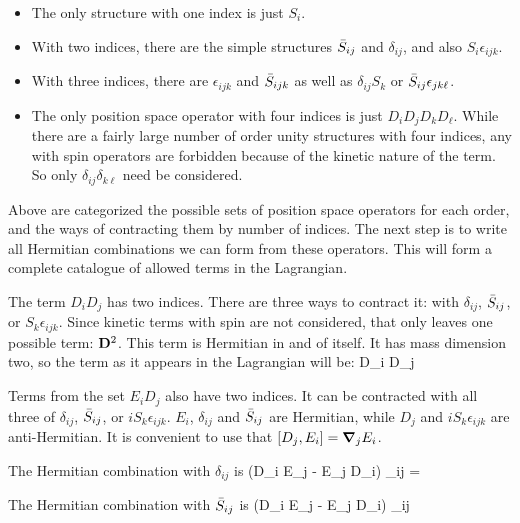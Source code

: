 \begin{itemize}
\item The only structure with one index is just $S_i$.

\item With two indices, there are the simple structures $\bar{S}_{ij}$ and $\delta_{ij}$, and also $S_i \epsilon_{ijk}$.

\item With three indices, there are $\epsilon_{ijk}$ and $\bar{S}_{ijk}$ as well as $\delta_{ij} S_k$ or $\bar{S}_{ij} \epsilon_{jk\ell}$.

\item The only position space operator with four indices is just $D_i D_j D_k D_\ell$.  While there are a fairly large number of order unity structures with four indices, any with spin operators are forbidden because of the kinetic nature of the term.  So only $\delta_{ij} \delta_{k\ell}$ need be considered.
\end{itemize}

Above are categorized the possible sets of position space operators for each order, and the ways of contracting them by number of indices.  The next step is to write all Hermitian combinations we can form from these operators.  This will form a complete catalogue of allowed terms in the Lagrangian.

The term $D_i D_j$ has two indices.  There are three ways to contract it: with $\delta_{ij}$, $\bar{S}_{ij}$, or $S_k \epsilon_{ijk}$.  Since kinetic terms with spin are not considered, that only leaves one possible term: $\mathbf{D}^2$.  This term is Hermitian in and of itself.  It has mass dimension two, so the term as it appears in the Lagrangian will be:
\beq
	 D_i D_j  \to {}
\eeq 

Terms from the set $E_i D_j$ also have two indices.  It can be contracted with all three of $\delta_{ij}$, $\bar{S}_{ij}$, or $i S_k \epsilon_{ijk}$.   
$E_i$, $\delta_{ij}$ and $\bar{S}_{ij}$ are Hermitian, while $D_j$ and $i S_k \epsilon_{ijk}$ are anti-Hermitian.  It is convenient to use that $[D_j, E_i] = \mbox{\boldmath$ \nabla $} _j E_i$.

The Hermitian combination with $\delta_{ij}$ is 
\beq
	(D_i E_j - E_j D_i) \delta_{ij} \to {} = 
\eeq

The Hermitian combination with $\bar{S}_{ij}$ is
\beq
	(D_i E_j - E_j D_i)  \Sb_{ij} \to {} 
\eeq

